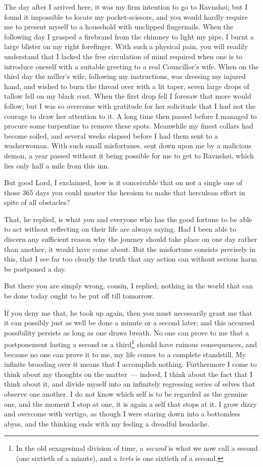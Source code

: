 \documentclass[12pt]{article}
\begin{document}
The day after I arrived here, it was my firm intention to go to
Ravnshøi; but I found it impossible to locate my pocket-scissors, and
you would hardly require me to present myself to a household with
unclipped fingernails. When the following day I grasped a firebrand
from the chimney to light my pipe, I burnt a large blister on my
right forefinger. With such a physical pain, you will readily
understand that I lacked the free circulation of mind required when
one is to introduce oneself with a suitable greeting to a real
Councillor's wife. When on the third day the miller's wife, following
my instructions, was dressing my injured hand, and wished to burn the
thread over with a lit taper, seven large drops of tallow fell on my
black coat. When the first drop fell I foresaw that more would follow;
but I was so overcome with gratitude for her solicitude that I had
not the courage to draw her attention to it. A long time then passed
before I managed to procure some turpentine to remove these spots.
Meanwhile my finest collars had become soiled, and several weeks
elapsed before I had them sent to a washerwoman. With such small
misfortunes, sent down upon me by a malicious demon, a year passed
without it being possible for me to get to Ravnshøi, which lies only
half a mile from this inn.

But good Lord, I exclaimed, how is it conceivable that on not a
single one of those 365 days you could muster the heroism to make
that herculean effort in spite of all obstacles?

That, he replied, is what you and everyone who has the good
fortune to be able to act without reflecting on their life are always
saying. Had I been able to discern any sufficient reason why the
journey should take place on one day rather than another, it would
have come about. But the misfortune consists precisely in this, that
I see far too clearly the truth that any action can without serious
harm be postponed a day.

But there you are simply wrong, cousin, I replied; nothing in the
world that can be done today ought to be put off till tomorrow.

If you deny me that, he took up again, then you must necessarily
grant me that it can possibly just as well be done a minute or a
second later; and this accursed possibility persists as long as one
draws breath. No one can prove to me that a postponement lasting a
second or a third\footnote{In the old sexagesimal division of time, a
  \emph{secund} is what we now call a second (one sixtieth of a
  minute), and a \emph{terts} is one sixtieth of a second.} should
have ruinous consequences, and because no one can prove it to me, my
life comes to a complete standstill. My infinite brooding over it
means that I accomplish nothing. Furthermore I come to think about my
thoughts on the matter~--- indeed, I think about the fact that I
think about it, and divide myself into an infinitely regressing series
of selves that observe one another. I do not know which self is to be
regarded as the genuine one, and the moment I stop at one, it is
again a self that stops at it. I grow dizzy and overcome with
vertigo, as though I were staring down into a bottomless abyss, and
the thinking ends with my feeling a dreadful headache.
\end{document}
